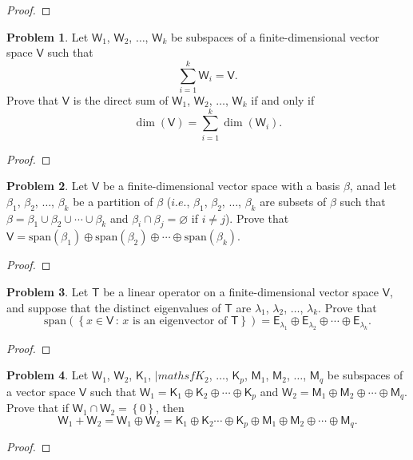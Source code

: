 \documentclass[12pt]{book}
\theoremstyle{definition}
\newtheorem{problem}{Problem}
\begin{document}
	\begin{proof}
	\end{proof}
	\newpage
	\setcounter{problem}{19}
	\begin{problem}
		Let $\mathsf{W}_1$, $\mathsf{W}_2$, $\ldots$, $\mathsf{W}_k$ be subspaces of a finite-dimensional vector space $\mathsf{V}$ such that
		$$\displaystyle\sum_{i=1}^k \mathsf{W}_i=\mathsf{V}.$$
		Prove that $\mathsf{V}$ is the direct sum of $\mathsf{W}_1$, $\mathsf{W}_2$, $\ldots$, $\mathsf{W}_k$ if and only if
		$$\dim(\mathsf{V})=\displaystyle\sum_{i=1}^k\dim(\mathsf{W}_i).$$
	\end{problem}
	\begin{proof}
	\end{proof}
	\newpage
	\begin{problem}
		Let $\mathsf{V}$ be a finite-dimensional vector space with a basis $\beta$, anad let $\beta_1$, $\beta_2$, $\ldots$, $\beta_k$ be a partition of $\beta$ ($i.e.$, $\beta_1$, $\beta_2$, $\ldots$, $\beta_k$ are subsets of $\beta$ such that $\beta=\beta_1\cup\beta_2\cup\cdots\cup\beta_k$ and $\beta_i\cap\beta_j=\varnothing$ if $i\neq j$). Prove that $\mathsf{V}=\text{span}(\beta_1)\oplus\text{span}(\beta_2)\oplus\cdots\oplus\text{span}(\beta_k)$.
	\end{problem}
	\begin{proof}
	\end{proof}
	\newpage
	\begin{problem}
		Let $\mathsf{T}$ be a linear operator on a finite-dimensional vector space $\mathsf{V}$, and suppose that the distinct eigenvalues of $\mathsf{T}$ are $\lambda_1$, $\lambda_2$, $\ldots$, $\lambda_k$. Prove that $$\text{span}\left(\left\{x\in\mathsf{V}\,:\,x\text{ is an eigenvector of }\mathsf{T}\right\}\right)=\mathsf{E}_{\lambda_1}\oplus\mathsf{E}_{\lambda_2}\oplus\cdots\oplus\mathsf{E}_{\lambda_k}.$$
	\end{problem}
	\begin{proof}
	\end{proof}
	\newpage	
	\begin{problem}
		Let $\mathsf{W}_1$, $\mathsf{W}_2$, $\mathsf{K}_1$, $|mathsf{K}_2$, $\ldots$, $\mathsf{K}_p$, $\mathsf{M}_1$, $\mathsf{M}_2$, $\ldots$, $\mathsf{M}_q$ be subspaces of a vector space $\mathsf{V}$ such that $\mathsf{W}_1=\mathsf{K}_1\oplus\mathsf{K}_2\oplus\cdots\oplus\mathsf{K}_p$ and $\mathsf{W}_2=\mathsf{M}_1\oplus\mathsf{M}_2\oplus\cdots\oplus\mathsf{M}_q$. Prove that if $\mathsf{W}_1\cap\mathsf{W}_2=\left\{\mathit{0}\right\}$, then$$\mathsf{W}_1+\mathsf{W}_2=\mathsf{W}_1\oplus\mathsf{W}_2=\mathsf{K}_1\oplus\mathsf{K}_2\cdots\oplus\mathsf{K}_p\oplus\mathsf{M}_1\oplus\mathsf{M}_2\oplus\cdots\oplus\mathsf{M}_q.$$
	\end{problem}
	\begin{proof}
	\end{proof}
	\setcounter{chapter}{5}
	\newpage
\end{document}

